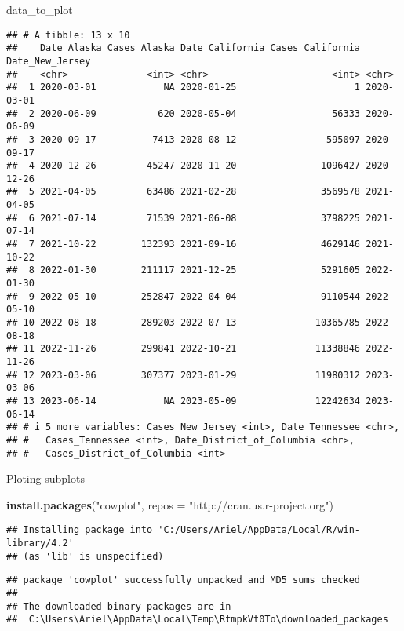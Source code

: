 \documentclass[
]{article}
\newenvironment{Shaded}{\begin{snugshade}}{\end{snugshade}}
\newcommand{\AttributeTok}[1]{\textcolor[rgb]{0.13,0.29,0.53}{#1}}
\newcommand{\FunctionTok}[1]{\textcolor[rgb]{0.13,0.29,0.53}{\textbf{#1}}}
\newcommand{\NormalTok}[1]{#1}
\newcommand{\StringTok}[1]{\textcolor[rgb]{0.31,0.60,0.02}{#1}}
\begin{document}
\begin{Shaded}
\begin{Highlighting}[]
\NormalTok{data\_to\_plot}
\end{Highlighting}
\end{Shaded}

\begin{verbatim}
## # A tibble: 13 x 10
##    Date_Alaska Cases_Alaska Date_California Cases_California Date_New_Jersey
##    <chr>              <int> <chr>                      <int> <chr>          
##  1 2020-03-01            NA 2020-01-25                     1 2020-03-01     
##  2 2020-06-09           620 2020-05-04                 56333 2020-06-09     
##  3 2020-09-17          7413 2020-08-12                595097 2020-09-17     
##  4 2020-12-26         45247 2020-11-20               1096427 2020-12-26     
##  5 2021-04-05         63486 2021-02-28               3569578 2021-04-05     
##  6 2021-07-14         71539 2021-06-08               3798225 2021-07-14     
##  7 2021-10-22        132393 2021-09-16               4629146 2021-10-22     
##  8 2022-01-30        211117 2021-12-25               5291605 2022-01-30     
##  9 2022-05-10        252847 2022-04-04               9110544 2022-05-10     
## 10 2022-08-18        289203 2022-07-13              10365785 2022-08-18     
## 11 2022-11-26        299841 2022-10-21              11338846 2022-11-26     
## 12 2023-03-06        307377 2023-01-29              11980312 2023-03-06     
## 13 2023-06-14            NA 2023-05-09              12242634 2023-06-14     
## # i 5 more variables: Cases_New_Jersey <int>, Date_Tennessee <chr>,
## #   Cases_Tennessee <int>, Date_District_of_Columbia <chr>,
## #   Cases_District_of_Columbia <int>
\end{verbatim}

Ploting subplots

\begin{Shaded}
\begin{Highlighting}[]
\FunctionTok{install.packages}\NormalTok{(}\StringTok{"cowplot"}\NormalTok{, }\AttributeTok{repos =} \StringTok{"http://cran.us.r{-}project.org"}\NormalTok{)}
\end{Highlighting}
\end{Shaded}

\begin{verbatim}
## Installing package into 'C:/Users/Ariel/AppData/Local/R/win-library/4.2'
## (as 'lib' is unspecified)
\end{verbatim}

\begin{verbatim}
## package 'cowplot' successfully unpacked and MD5 sums checked
## 
## The downloaded binary packages are in
##  C:\Users\Ariel\AppData\Local\Temp\RtmpkVt0To\downloaded_packages
\end{verbatim}
\end{document}
